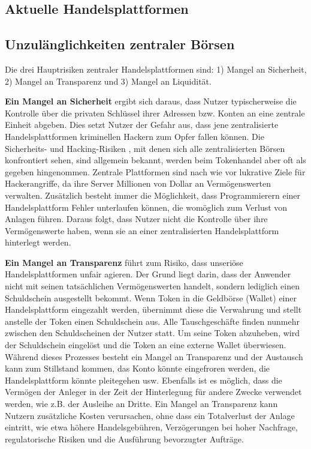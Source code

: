 \documentclass[UTF8,nofonts]{article}
\begin{document}
\begin{multicols}{2}
\section{Aktuelle Handelsplattformen\label{sec:current_exchange_landscape}}

\subsection{Unzulänglichkeiten zentraler Börsen}
Die drei Hauptrisiken zentraler Handelsplattformen sind: 1) Mangel an Sicherheit, 2) Mangel an Transparenz und 3) Mangel an Liquidität.

\textbf{Ein Mangel an Sicherheit} ergibt sich daraus, dass Nutzer typischerweise die Kontrolle über die privaten Schlüssel ihrer Adressen bzw. Konten an eine zentrale Einheit abgeben. Dies setzt Nutzer der Gefahr aus, dass jene zentralisierte Handelsplattformen kriminellen Hackern zum Opfer fallen können. Die Sicherheits- und Hacking-Risiken \cite{coincheckhack}  \cite{mcmillan2014inside}, mit denen sich alle zentralisierten Börsen konfrontiert sehen, sind allgemein bekannt, werden beim Tokenhandel aber oft als gegeben hingenommen. Zentrale Plattformen sind nach wie vor lukrative Ziele für Hackerangriffe, da ihre Server Millionen von Dollar an Vermögenswerten verwalten. Zusätzlich besteht immer die Möglichkeit, dass Programmierern einer Handelsplattform Fehler unterlaufen können, die womöglich zum Verlust von Anlagen führen. Daraus folgt, dass Nutzer nicht die Kontrolle über ihre Vermögenswerte haben, wenn sie an einer zentralisierten Handelsplattform hinterlegt werden.

\textbf{Ein Mangel an Transparenz} führt zum Risiko, dass unseriöse Handelsplattformen unfair agieren. Der Grund liegt darin, dass der Anwender nicht mit seinen tatsächlichen Vermögenswerten handelt, sondern lediglich einen Schuldschein ausgestellt bekommt. Wenn Token in die Geldbörse (Wallet) einer Handelsplattform eingezahlt werden, übernimmt diese die Verwahrung und stellt anstelle der Token einen Schuldschein aus. Alle Tauschgeschäfte finden nunmehr zwischen den Schuldscheinen der Nutzer statt. Um seine Token abzuheben, wird der Schuldschein eingelöst und die Token an eine externe Wallet überwiesen. Während dieses Prozesses besteht ein Mangel an Transparenz und der Austausch kann zum Stillstand kommen, das Konto könnte eingefroren werden, die Handelsplattform könnte pleitegehen usw. Ebenfalls ist es möglich, dass die Vermögen der Anleger in der Zeit der Hinterlegung für andere Zwecke verwendet werden, wie z.B. der Ausleihe an Dritte. Ein Mangel an Transparenz kann Nutzern zusätzliche Kosten verursachen, ohne dass ein Totalverlust der Anlage eintritt, wie etwa höhere Handelsgebühren, Verzögerungen bei hoher Nachfrage, regulatorische Risiken und die Ausführung bevorzugter Aufträge.


\end{multicols}
\end{document}
